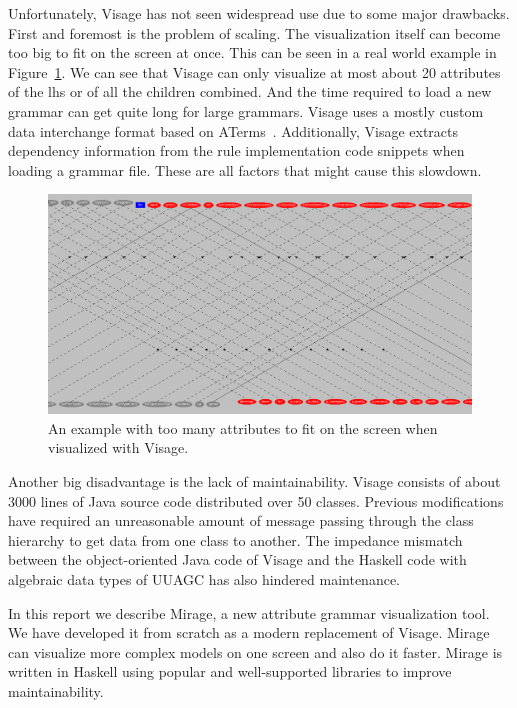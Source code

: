 \documentclass[11pt]{article}
\begin{document}
Unfortunately, Visage has not seen widespread use due to some major drawbacks.
First and foremost is the problem of scaling.
The visualization itself can become too big to fit on the screen at once.
This can be seen in a real world example in Figure~\ref{big-visage}.
We can see that Visage can only visualize at most about 20 attributes of the lhs or of all the children combined.
And the time required to load a new grammar can get quite long for large grammars. Visage uses a mostly custom data interchange format based on ATerms~\cite{aterms}. Additionally, Visage extracts dependency information from the rule implementation code snippets when loading a grammar file. These are all factors that might cause this slowdown.

\begin{figure}[h]
  \centering
  \includegraphics[width=\linewidth]{big-visage}
  \caption{An example with too many attributes to fit on the screen when visualized with Visage.}
  \label{big-visage}
\end{figure}

Another big disadvantage is the lack of maintainability. Visage consists of about 3000 lines of Java source code distributed over 50 classes. Previous modifications have required an unreasonable amount of message passing through the class hierarchy to get data from one class to another.
The impedance mismatch between the object-oriented Java code of Visage and the Haskell code with algebraic data types of UUAGC has also hindered maintenance.

In this report we describe Mirage, a new attribute grammar visualization tool.
We have developed it from scratch as a modern replacement of Visage.
Mirage can visualize more complex models on one screen and also do it faster.
Mirage is written in Haskell using popular and well-supported libraries to improve maintainability.
\end{document}
